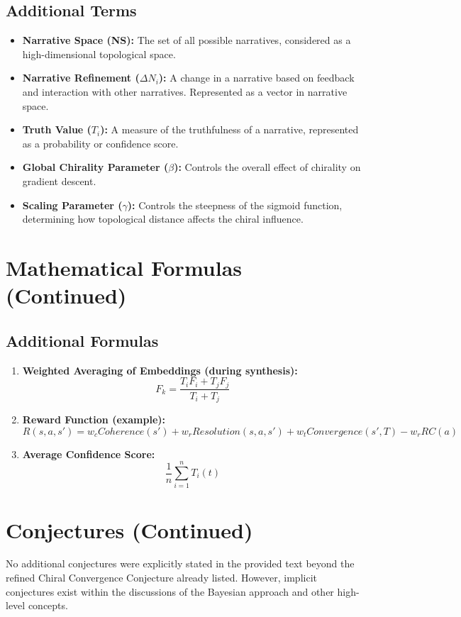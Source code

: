 \documentclass{article}
\begin{document}
\subsection{Additional Terms}

\begin{itemize}
    \item \textbf{Narrative Space (NS): } The set of all possible narratives, considered as a high-dimensional topological space.
    \item \textbf{Narrative Refinement ($\Delta N_i$): } A change in a narrative based on feedback and interaction with other narratives.  Represented as a vector in narrative space.
    \item \textbf{Truth Value ($T_i$): } A measure of the truthfulness of a narrative, represented as a probability or confidence score.
    \item \textbf{Global Chirality Parameter ($\beta$): } Controls the overall effect of chirality on gradient descent.
    \item \textbf{Scaling Parameter ($\gamma$): }  Controls the steepness of the sigmoid function, determining how topological distance affects the chiral influence.
\end{itemize}


\section{Mathematical Formulas (Continued)}

\subsection{Additional Formulas}

\begin{enumerate}
    \item \textbf{Weighted Averaging of Embeddings (during synthesis): }
    \[
    F_k = \frac{T_i F_i + T_j F_j}{T_i + T_j}
    \]
    \item \textbf{Reward Function (example): }
    \[
    R(s, a, s') = w_c Coherence(s') + w_r Resolution(s, a, s') + w_t Convergence(s', T) - w_r RC(a)
    \]
    \item \textbf{Average Confidence Score: }
    \[
    \frac{1}{n} \sum_{i=1}^n T_i(t)
    \]
\end{enumerate}

\section{Conjectures (Continued)}


No additional conjectures were explicitly stated in the provided text beyond the refined Chiral Convergence Conjecture already listed.  However,  implicit conjectures exist within the discussions of the Bayesian approach and other high-level concepts.
\end{document}
